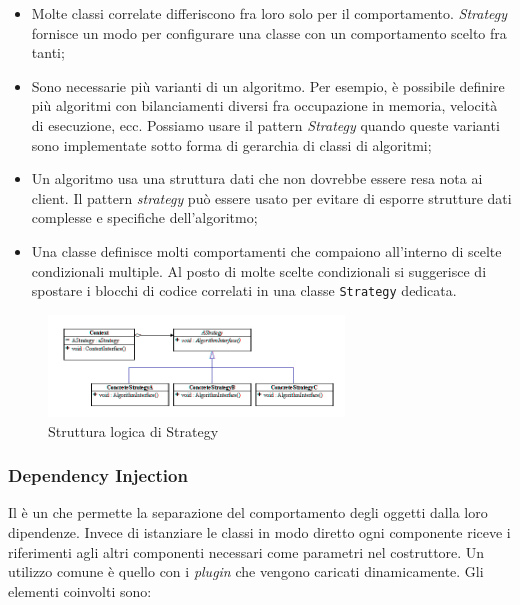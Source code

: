 \begin{itemize}

	\item Molte classi correlate differiscono fra loro solo per il comportamento. \textit{Strategy} fornisce un modo per configurare una classe con un comportamento scelto fra tanti;
	\item Sono necessarie più varianti di un algoritmo. Per esempio, è possibile definire più algoritmi con bilanciamenti diversi fra occupazione in memoria, velocità di esecuzione, ecc. Possiamo usare il pattern \textit{Strategy} quando queste varianti sono implementate sotto forma di gerarchia di classi di algoritmi;
	\item Un algoritmo usa una struttura dati che non dovrebbe essere resa nota ai client. Il pattern \textit{strategy} può essere usato per evitare di esporre strutture dati complesse e specifiche dell'algoritmo;
	\item Una classe definisce molti comportamenti che compaiono all'interno di scelte condizionali multiple. Al posto di molte scelte condizionali si suggerisce di spostare i blocchi di codice correlati in una classe \texttt{Strategy} dedicata.
	
\end{itemize}

\begin{figure}[H]
\centering \includegraphics[width=0.7\textwidth]{patterns/strategy.jpg}
\caption{Struttura logica di Strategy}
\label{fig:strategy}
\end{figure}
	
\subsubsection{Dependency Injection}

Il  è un  che permette la separazione del comportamento degli oggetti dalla loro dipendenze. Invece di istanziare le classi in modo diretto ogni componente riceve i riferimenti agli altri componenti necessari come parametri nel costruttore. Un utilizzo comune è quello con i 	\emph{plugin} che vengono caricati dinamicamente. Gli elementi coinvolti sono:
	
